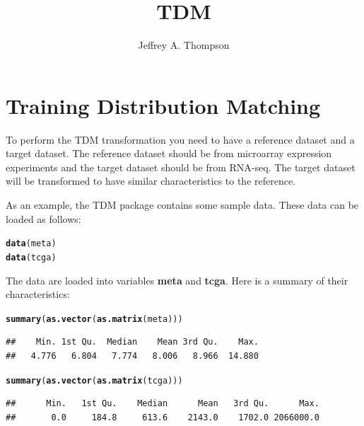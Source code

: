\documentclass{article}\usepackage[]{graphicx}\usepackage[]{color}
\makeatletter
\newcommand{\hlstd}[1]{\textcolor[rgb]{0.345,0.345,0.345}{#1}}%
\newcommand{\hlkwd}[1]{\textcolor[rgb]{0.737,0.353,0.396}{\textbf{#1}}}%
\newenvironment{kframe}{%
 \def\at@end@of@kframe{}%
 \ifinner\ifhmode%
  \def\at@end@of@kframe{\end{minipage}}%
  \begin{minipage}{\columnwidth}%
 \fi\fi%
 \def\FrameCommand##1{\hskip\@totalleftmargin \hskip-\fboxsep
 \colorbox{shadecolor}{##1}\hskip-\fboxsep
     \hskip-\linewidth \hskip-\@totalleftmargin \hskip\columnwidth}%
 \MakeFramed {\advance\hsize-\width
   \@totalleftmargin\z@ \linewidth\hsize
   \@setminipage}}%
 {\par\unskip\endMakeFramed%
 \at@end@of@kframe}
\newenvironment{knitrout}{}{} %
\makeatother
\begin{document}
\title{TDM}
\author{Jeffrey A. Thompson}
\maketitle




\section{Training Distribution Matching}

To perform the TDM transformation you need to have a reference dataset and a
target dataset. The reference dataset should be from microarray expression
experiments and the target dataset should be from RNA-seq. The target dataset
will be transformed to have similar characteristics to the reference.

As an example, the TDM package contains some sample data. These data can be
loaded as follows:

\begin{knitrout}
\color{fgcolor}\begin{kframe}
\begin{alltt}
\hlkwd{data}\hlstd{(meta)}
\hlkwd{data}\hlstd{(tcga)}
\end{alltt}
\end{kframe}
\end{knitrout}

The data are loaded into variables \textbf{meta} and \textbf{tcga}. Here is a
summary of their characteristics:

\begin{knitrout}
\color{fgcolor}\begin{kframe}
\begin{alltt}
\hlkwd{summary}\hlstd{(}\hlkwd{as.vector}\hlstd{(}\hlkwd{as.matrix}\hlstd{(meta)))}
\end{alltt}
\begin{verbatim}
##    Min. 1st Qu.  Median    Mean 3rd Qu.    Max. 
##   4.776   6.804   7.774   8.006   8.966  14.880
\end{verbatim}
\begin{alltt}
\hlkwd{summary}\hlstd{(}\hlkwd{as.vector}\hlstd{(}\hlkwd{as.matrix}\hlstd{(tcga)))}
\end{alltt}
\begin{verbatim}
##      Min.   1st Qu.    Median      Mean   3rd Qu.      Max. 
##       0.0     184.8     613.6    2143.0    1702.0 2066000.0
\end{verbatim}
\end{kframe}
\end{knitrout}
\end{document}
